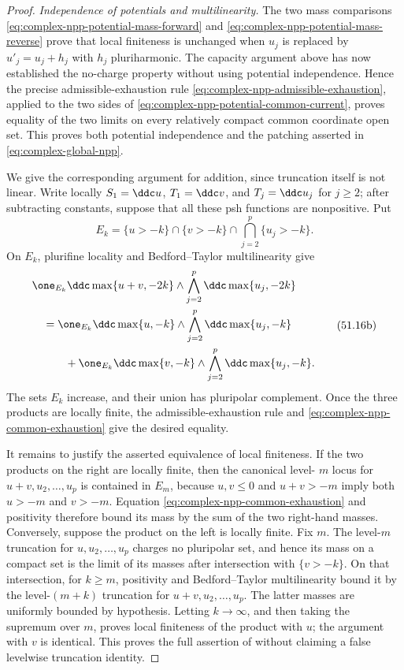 \begin{proof}
\emph{Independence of potentials and multilinearity.}
The two mass comparisons
\eqref{eq:complex-npp-potential-mass-forward} and
\eqref{eq:complex-npp-potential-mass-reverse} prove that local finiteness is
unchanged when $u_j$ is replaced by $u'_j=u_j+h_j$ with $h_j$
pluriharmonic.  The capacity argument above has now established the
no-charge property without using potential independence.  Hence the precise
admissible-exhaustion rule
\eqref{eq:complex-npp-admissible-exhaustion}, applied to the two sides of
\eqref{eq:complex-npp-potential-common-current}, proves equality of the two
limits on every relatively compact common coordinate open set.  This proves
both potential independence and the patching asserted in
\eqref{eq:complex-global-npp}.

We give the corresponding argument for addition, since truncation itself is
not linear.  Write locally
$S_1=\ddc u$, $T_1=\ddc v$, and
$T_j=\ddc u_j$ for $j\geq2$; after subtracting constants, suppose that
all these psh functions are nonpositive.  Put
\[
 E_k=\{u>-k\}\cap\{v>-k\}
             \cap\bigcap_{j=2}^p\{u_j>-k\}.
\]
On $E_k$, plurifine locality and Bedford--Taylor multilinearity give
\[
\begin{aligned}
 &\one_{E_k}\ddc\max\{u+v,-2k\}
       \wedge\bigwedge_{j=2}^p\ddc\max\{u_j,-2k\}\\
 &\quad=
 \one_{E_k}\ddc\max\{u,-k\}
       \wedge\bigwedge_{j=2}^p\ddc\max\{u_j,-k\}\\
 &\qquad\quad+
 \one_{E_k}\ddc\max\{v,-k\}
       \wedge\bigwedge_{j=2}^p\ddc\max\{u_j,-k\}.
\end{aligned}
\tag{51.16b}\label{eq:complex-npp-common-exhaustion}
\]
The sets $E_k$ increase, and their union has pluripolar complement.  Once
the three products are locally finite, the admissible-exhaustion rule and
\eqref{eq:complex-npp-common-exhaustion} give the desired equality.

It remains to justify the asserted equivalence of local finiteness.  If the
two products on the right are locally finite, then the canonical level-
$m$ locus for $u+v,u_2,\ldots,u_p$ is contained in $E_m$, because
$u,v\leq0$ and $u+v>-m$ imply both $u>-m$ and $v>-m$.
Equation \eqref{eq:complex-npp-common-exhaustion} and positivity therefore
bound its mass by the sum of the two right-hand masses.  Conversely, suppose
the product on the left is locally finite.  Fix $m$.  The level-$m$
truncation for $u,u_2,\ldots,u_p$ charges no pluripolar set, and hence its
mass on a compact set is the limit of its masses after intersection with
$\{v>-k\}$.  On that intersection, for $k\geq m$, positivity and
Bedford--Taylor multilinearity bound it by the level-$(m+k)$ truncation
for $u+v,u_2,\ldots,u_p$.  The latter masses are uniformly bounded by
hypothesis.  Letting $k\to\infty$, and then taking the supremum over
$m$, proves local finiteness of the product with $u$; the argument with
$v$ is identical.  This proves the full assertion of
\cite[Proposition~1.4]{BEGZ10} without claiming a false levelwise
truncation identity.


\end{proof}
